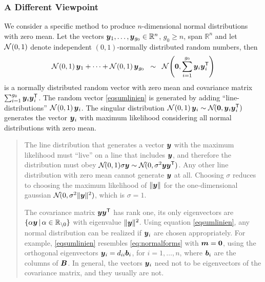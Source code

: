 \documentclass{article} %
\newenvironment{einschub}{%
\begin{small} \begin{quotation}\noindent}{%
  \vspace{0.5ex}\end{quotation}\end{small}%
}
\newcommand{\R}{\mathbb{R}}
\newcommand{\kom}[1]{}
\newcommand{\ve}[1]{\mathchoice{\mbox{\boldmath$\displaystyle#1$}}
  {\mbox{\boldmath$\textstyle#1$}} {\mbox{\boldmath$\scriptstyle#1$}}
  {\mbox{\boldmath$\scriptscriptstyle#1$}}}
\newcommand{\ma}[1]{\mathchoice{\mbox{\boldmath$\displaystyle#1$}}
  {\mbox{\boldmath$\textstyle#1$}} {\mbox{\boldmath$\scriptstyle#1$}}
  {\mbox{\boldmath$\scriptscriptstyle#1$}}}
\newcommand{\T}{\ensuremath{\mathsf{T}}}
\newcommand{\N}{\ensuremath{n}}
\newcommand{\Rn}{\R^{\N}}
\newcommand{\Normal}[1]{{\mathcal N}\hspace{-0.13em}\left(#1\right)}
\newcommand{\textNormal}[1]{\mathcal{N}\hspace{-0.13em}(#1)}
\newcommand{\eqeqref}[1]{equation \eqref{#1}}
\begin{document}
\subsubsection{A Different Viewpoint}
We consider a specific method to produce $\N$-dimensional normal
 distributions with zero mean. Let the vectors
 $\ve{y}_1,\dots,\ve{y}_{g_0}\in\Rn$, $g_0\ge \N$, span $\Rn$ and let
 $\Normal{0,1}$ denote independent $(0,1)$-normally distributed random
 numbers, then
%
\begin{equation}\label{eqsumlinien}
        \Normal{0,1}\ve{y}_1 + \dots + \Normal{0,1}\ve{y}_{g_0}
       \;\;\sim\;\;\Normal{\ve{0},\sum_{i=1}^{g_0} \ve{y}_i\ve{y}_i^\T}
\end{equation}
%
 is a normally distributed random vector with zero
 mean and covariance matrix
   $\kom{\ma{C} = }\sum_{i=1}^{g_0} \ve{y}_i\ve{y}_i^\T$.
%
%
 The random vector \eqref{eqsumlinien} is generated by adding
 ``line-distributions''
 $\Normal{0,1}\ve{y}_i\kom{\,\sim\textNormal{\ve{0},\ve{y}_i\ve{y}_i^{\T}}}$.
 The singular distribution $\Normal{0,1}\ve{y}_i \sim
 \textNormal{\ve{0},\ve{y}_i\ve{y}_i^{\T}}$ generates the vector
 $\ve{y}_{i}$ with maximum likelihood considering all normal
 {distributions} with zero mean.
%
 \begin{einschub}%
%
   The line distribution that generates a vector $\ve{y}$ with the
   maximum likelihood must ``live'' on a line that includes $\ve{y}$,
   and therefore the distribution must obey $\textNormal{0, 1} \sigma
   \ve{y} \sim \textNormal{0, \sigma^2\ve{y}\ve{y}^\T}$. Any other
   line distribution with zero mean cannot generate $\ve{y}$ at
   all. Choosing $\sigma$ reduces to choosing the maximum likelihood
   of $\|\ve{y}\|$ for the one-dimensional gaussian
   $\textNormal{0,\sigma^2\|\ve{y}\|^2}$, which is $\sigma=1$.

   The covariance matrix $\ve{y}\ve{y}^\T$ has rank one, its only
   eigenvectors are $\{\alpha\ve{y}\,|\, \alpha\in\R_{\setminus 0}\}$ with eigenvalue
   $\|\ve{y}\|^2$.  Using \eqeqref{eqsumlinien}, any normal
   distribution can be realized if $\ve{y}_i$ are chosen
   appropriately. For example, \eqref{eqsumlinien} resembles
   \eqref{eq:normalforms} with $\ve{m}=\ve{0}$, using the orthogonal
   eigenvectors $\ve{y}_i=d_{ii}\ve{b}_i$, for $i=1,\dots,\N$, where
   $\ve{b}_i$ are the columns of $\ma{B}$. In general, the vectors
   $\ve{y}_i$ need not to be eigenvectors of the covariance matrix,
   and they usually are not. \kom{ Moreover, given \eqeqref{eqCsumy} for
   the covariance matrix we can easily generate the distribution using
   \eqref{eqsumlinien}.}
\end{einschub}
\end{document}
